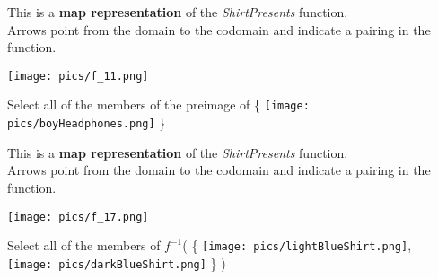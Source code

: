 \documentclass{ximera}
\author{Lee Wayand}
\begin{document}
\begin{exercise}


This is a \textbf{map representation} of the \textit{ShirtPresents} function. \\

Arrows point from the domain to the codomain and indicate a pairing in the function.

\begin{image}
\texttt{[image: pics/f\_11.png]}
\end{image}



Select all of the members of the preimage of \huge\{ \texttt{[image: pics/boyHeadphones.png]} \huge\}



\begin{selectAll}
\end{selectAll}



\end{exercise}















\begin{exercise}


This is a \textbf{map representation} of the \textit{ShirtPresents} function. \\

Arrows point from the domain to the codomain and indicate a pairing in the function.

\begin{image}
\texttt{[image: pics/f\_17.png]}
\end{image}



Select all of the members of $f^{-1}$\huge( \huge\{ \texttt{[image: pics/lightBlueShirt.png]}, \texttt{[image: pics/darkBlueShirt.png]} \huge\} \huge)



\begin{selectAll}
\end{selectAll}



\end{exercise}
\end{document}
